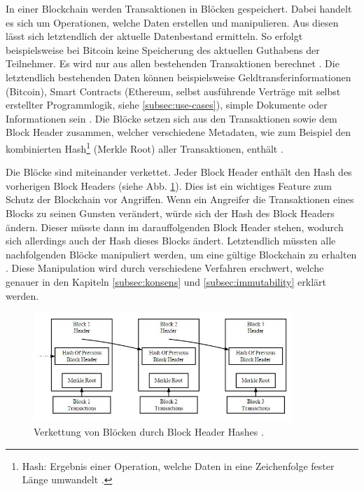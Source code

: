 In einer Blockchain werden Transaktionen in Blöcken gespeichert. Dabei handelt es sich um Operationen, welche Daten erstellen und manipulieren. Aus diesen lässt sich letztendlich der aktuelle Datenbestand ermitteln. So erfolgt beispielsweise bei Bitcoin keine Speicherung des aktuellen Guthabens der Teilnehmer. Es wird nur aus allen bestehenden Transaktionen berechnet \cite[S.~85]{AntonopoulosMasteringbitcoin2015}. Die letztendlich bestehenden Daten können beispielsweise Geldtransferinformationen (Bitcoin), Smart Contracts (Ethereum, selbst ausführende Verträge mit selbst erstellter Programmlogik, siehe \ref{subsec:use-cases}), simple Dokumente oder Informationen sein \cite{EthereumTeamEthereumWhitePaper2017}\cite{NakamotoBitcoinPeertoPeerElectronic2008}\cite{HyperledgerFabricTeamHyperledgerWhitepaper2016}. Die Blöcke setzen sich aus den Transaktionen sowie dem Block Header zusammen, welcher verschiedene Metadaten, wie zum Beispiel den kombinierten Hash\footnote{Hash: Ergebnis einer Operation, welche Daten in eine Zeichenfolge fester Länge umwandelt \cite[S.~\Rn{7}]{SwanBlockchainblueprintnew2015}.} (Merkle Root) aller Transaktionen, enthält \cite[S.~160-161]{AntonopoulosMasteringbitcoin2015}.

Die Blöcke sind miteinander verkettet. Jeder Block Header enthält den Hash  des vorherigen Block Headers (siehe Abb. \ref{fig:block-chain}). Dies ist ein wichtiges Feature zum Schutz der Blockchain vor Angriffen. Wenn ein Angreifer die Transaktionen eines Blocks zu seinen Gunsten verändert, würde sich der Hash des Block Headers ändern. Dieser müsste dann im darauffolgenden Block Header stehen, wodurch sich allerdings auch der Hash dieses Blocks ändert. Letztendlich müssten alle nachfolgenden Blöcke manipuliert werden, um eine gültige Blockchain zu erhalten \cite{NakamotoBitcoinPeertoPeerElectronic2008}. Diese Manipulation wird durch verschiedene Verfahren erschwert, welche genauer in den Kapiteln \ref{subsec:konsens} und \ref{subsec:immutability} erklärt werden.

\begin{figure}[!htbp]
  \centering
	\includegraphics[width=0.87\textwidth,angle=0]{images/block-chain}
 	\caption{Verkettung von Blöcken durch Block Header Hashes \cite{RosicWhatHashingHood2017}.}
	\label{fig:block-chain}
\end{figure}

